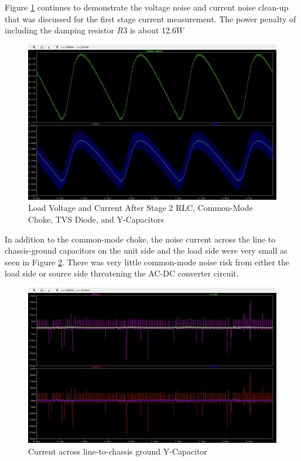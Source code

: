 \documentclass[conference]{IEEEtran}
\begin{document}
Figure \ref{fig:output_filter_load_after_rlc_stage_2_waveforms} continues to demonstrate the voltage noise and current noise clean-up that was discussed for the first stage current measurement. The power penalty of including the damping resistor $R3$ is about 12.6$W$

\begin{figure}[htp]
    \centering
    \includegraphics[width=1.0\linewidth]{output_filter_load_waveform.png}
    \caption{Load Voltage and Current After Stage 2 RLC, Common-Mode Choke, TVS Diode, and Y-Capacitors}
    \label{fig:output_filter_load_after_rlc_stage_2_waveforms}
\end{figure}

In addition to the common-mode choke, the noise current across the line to chassis-ground capacitors on the unit side and the load side were very small as seen in Figure \ref{fig:output_filter_chassis_ground_y_capacitors_waveforms}. There was very little common-mode noise risk from either the load side or source side threatening the AC-DC converter circuit.  

\begin{figure}[htp]
    \centering
    \includegraphics[width=1.0\linewidth]{output_filter_chassis_ground_y_capacitors.png}
    \caption{Current across line-to-chassis ground Y-Capacitor}
    \label{fig:output_filter_chassis_ground_y_capacitors_waveforms}
\end{figure}
\end{document}
